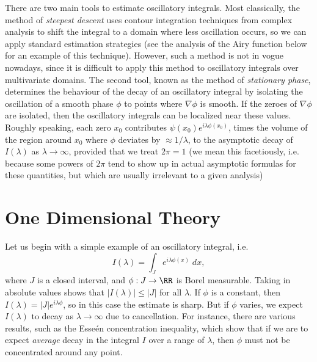 There are two main tools to estimate oscillatory integrals. Most classically, the method of \emph{steepest descent} uses contour integration techniques from complex analysis to shift the integral to a domain where less oscillation occurs, so we can apply standard estimation strategies (see the analysis of the Airy function below for an example of this technique). However, such a method is not in vogue nowadays, since it is difficult to apply this method to oscillatory integrals over multivariate domains. The second tool, known as the method of \emph{stationary phase}, determines the behaviour of the decay of an oscillatory integral by isolating the oscillation of a smooth phase $\phi$ to points where $\nabla \phi$ is smooth. If the zeroes of $\nabla \phi$ are isolated, then the oscillatory integrals can be localized near these values. Roughly speaking, each zero $x_0$ contributes $\psi(x_0) e^{i \lambda \phi(x_0)}$, times the volume of the region around $x_0$ where $\phi$ deviates by $\approx 1/\lambda$, to the asymptotic decay of $I(\lambda)$ as $\lambda \to \infty$, provided that we treat $2 \pi = 1$ (we mean this facetiously, i.e. because some powers of $2\pi$ tend to show up in actual asymptotic formulas for these quantities, but which are usually irrelevant to a given analysis)

\section{One Dimensional Theory}

Let us begin with a simple example of an oscillatory integral, i.e.
%
\[ I(\lambda) = \int_J e^{i \lambda \phi(x)}\; dx, \]
%
where $J$ is a closed interval, and $\phi: J \to \RR$ is Borel measurable. Taking in absolute values shows that $|I(\lambda)| \leq |J|$ for all $\lambda$. If $\phi$ is a constant, then $I(\lambda) = |J| e^{i \lambda \phi}$, so in this case the estimate is sharp. But if $\phi$ varies, we expect $I(\lambda)$ to decay as $\lambda \to \infty$ due to cancellation. For instance, there are various results, such as the Esse\'{e}n concentration inequality, which show that if we are to expect \emph{average} decay in the integral $I$ over a range of $\lambda$, then $\phi$ must not be concentrated around any point.

